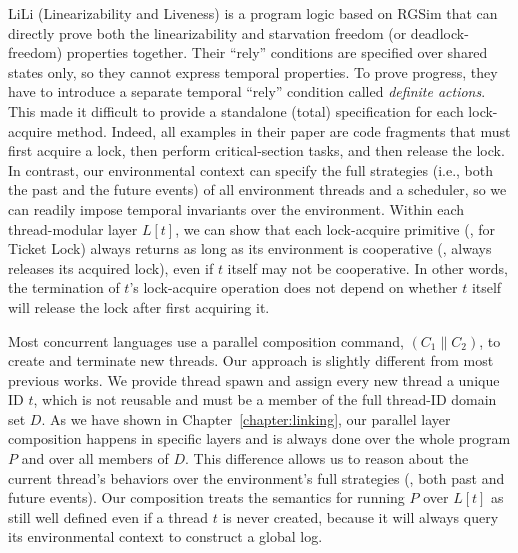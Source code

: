 LiLi (Linearizability and Liveness) is a program logic based on RGSim
that can
directly prove both the linearizability and starvation freedom (or
deadlock-freedom) properties together. 
Their ``rely'' conditions are specified
over shared states only, so they cannot express temporal properties. 
To prove progress, they have to introduce a separate temporal ``rely''
condition called {\em definite actions}.  This made it difficult to
provide a standalone (total) specification for each lock-acquire
method.  Indeed, all examples in their paper are code fragments that
must first acquire a lock, then perform critical-section tasks, and then release the
lock. In contrast, our environmental context can specify the full
strategies (i.e., both the past and the future events) of all
environment threads and a scheduler, so we can readily impose
temporal invariants over the environment. Within each thread-modular
layer $L[t]$, we can show that each lock-acquire primitive (\eg, for
Ticket Lock) always returns as long as its environment is cooperative
(\eg, always releases its acquired lock), even if $t$ itself may not
be cooperative.
In other words, the termination of $t$'s lock-acquire
operation does not depend on whether $t$ itself will release the lock
after first acquiring it.


Most concurrent languages use a
parallel composition command, $(C_1 \| C_2)$, to create and terminate
new threads.  
Our approach is slightly different from most previous works.
We provide thread spawn and assign every new thread a unique ID $t$,
which is not reusable and must be a member of the full thread-ID domain set $D$.
As we have shown in Chapter~\ref{chapter:linking},
our parallel layer composition happens in specific layers and is
always done over the whole program $P$ and over
all members of $D$. 
This difference allows us to reason about the current
thread's behaviors over the environment's full strategies (\ie, both
past and future events).
Our composition treats the semantics for running $P$ over $L[t]$ as still well
defined even if a thread $t$ is never
created, because it will always query its environmental context to
construct a global log.



